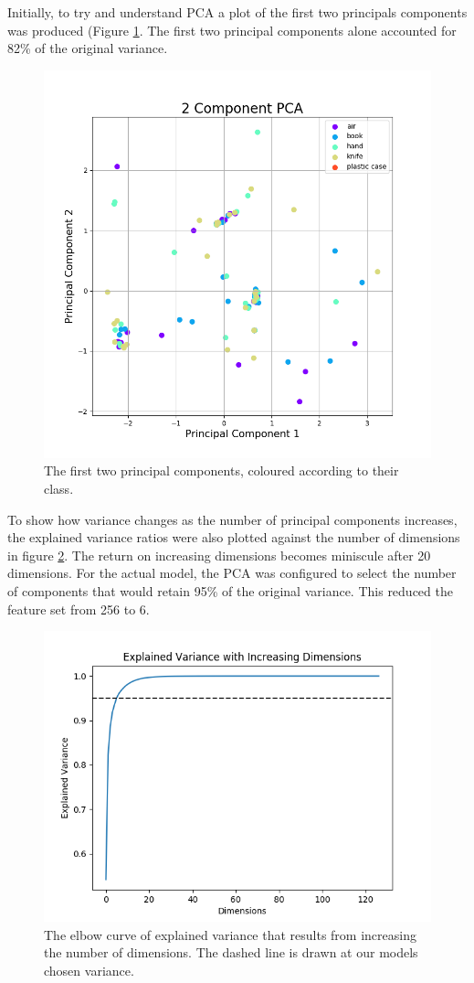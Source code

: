 \documentclass[12pt]{article}
\begin{document}
Initially, to try and understand PCA a plot of the first two principals components was produced (Figure \ref{fig:pca1}. The first two principal components alone accounted for 82\% of the original variance.

\begin{figure}[!ht]
	\centering
	\includegraphics[width=0.8\linewidth]{images/2dpca}
	\caption{The first two principal components, coloured according to their class.}
	\label{fig:pca1}
\end{figure}

To show how variance changes as the number of principal components increases, the explained variance ratios were also plotted against the number of dimensions in figure \ref{fig:explainedvariance}. The return on increasing dimensions becomes miniscule after 20 dimensions.
For the actual model, the PCA was configured to select the number of components that would retain 95\% of the original variance. This reduced the feature set from 256 to 6.

\begin{figure}[!ht]
	\centering
	\includegraphics[width=0.8\linewidth]{images/explainedvariance}
	\caption{The elbow curve of explained variance that results from increasing the number of dimensions. The dashed line is drawn at our models chosen variance.}
	\label{fig:explainedvariance}
\end{figure}
\end{document}
